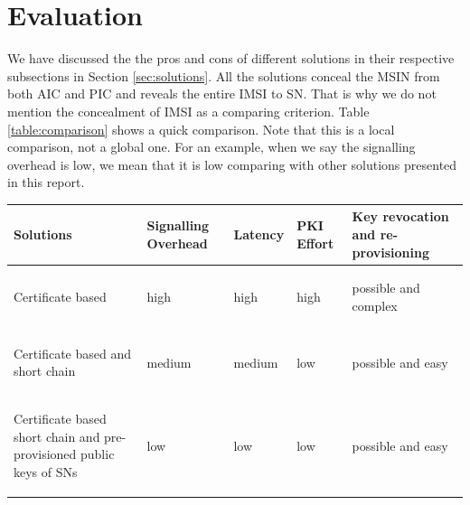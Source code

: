 \documentclass[12pt]{llncs}
\begin{document}
\section{Evaluation}
\label{sec:evaluation}
We have discussed the the pros and cons of different solutions in their respective subsections in Section \ref{sec:solutions}. All the solutions conceal the MSIN from both AIC and PIC and reveals the entire IMSI to SN. That is why we do not mention the concealment of IMSI as a comparing criterion.  Table \ref{table:comparison} shows a quick comparison. Note that this is a local comparison, not a global one. For an example, when we say the signalling overhead is low, we mean that it is low comparing with other solutions presented in this report. 
\begin{table}
\begin{center}
\begin{tabular}{ |p{3.5cm}|p{2cm}|p{2cm}|p{2cm}|p{2cm}|  }
\hline
\textbf{Solutions} & \textbf{Signalling Overhead} & \textbf{Latency} & \textbf{PKI Effort} & \textbf{Key revocation and re-provisioning}\\
\hline \hline
\begin{center} Certificate based \end{center} & \begin{center} high \end{center} & \begin{center} high \end{center} & \begin{center} high \end{center} & \begin{center} possible and complex \end{center}\\ \hline
\begin{center} Certificate based and short chain \end{center} & \begin{center} medium \end{center} & \begin{center} medium \end{center} &  \begin{center} low \end{center} & \begin{center} possible and easy \end{center} \\ \hline
\begin{center} Certificate based short chain and pre-provisioned public keys of SNs \end{center} & \begin{center} low \end{center} & \begin{center} low \end{center} & \begin{center} low \end{center} & \begin{center} possible and easy \end{center} \\ \hline

\end{tabular}
\end{center}
\end{table}
\end{document}
